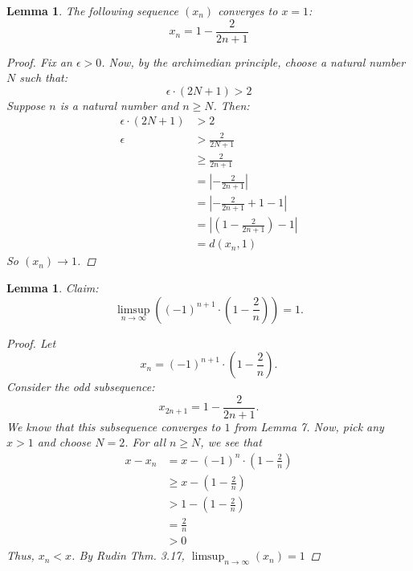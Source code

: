 \documentclass{amsart}
\newtheorem{lemma}[theorem]{Lemma}
\begin{document}
\begin{lemma} 
    The following sequence $(x_n)$ converges to $x = 1$:
    \[
        x_n = 1 - \frac{2}{2n + 1}    
    \]
    \begin{proof}
        Fix an $\epsilon > 0$. Now, by the archimedian principle, choose a natural number $N$ such that:
        \[
            \epsilon \cdot (2N + 1) > 2
        \]
        Suppose $n$ is a natural number and $n \geq N$. Then:
        \begin{align*}
            \epsilon \cdot (2N + 1) &> 2 \\
            \epsilon &> \frac{2}{2N + 1} \\
            &\geq \frac{2}{2n + 1} \\
            &= \left| -\frac{2}{2n + 1} \right| \\
            &= \left| -\frac{2}{2n + 1} + 1 - 1\right| \\
            &= \left|\left(1  -\frac{2}{2n + 1}\right) - 1\right| \\
            &= d(x_n, 1)
        \end{align*}
        So $(x_n) \to 1$.
    \end{proof}
\end{lemma}
\begin{lemma}
    Claim:
    \[
        \limsup_{n \to \infty} \left((-1)^{n+1} \cdot \left( 1 - \frac{2}{n} \right) \right) = 1.
    \]
    \begin{proof}
       Let 
       \[
            x_n = (-1)^{n+1} \cdot \left( 1 - \frac{2}{n} \right).
       \]
       Consider the odd subsequence: 
       \[
            x_{2n + 1} = 1 - \frac{2}{2n + 1} .
       \]
       We know that this subsequence converges to $1$ from Lemma 7.
       Now, pick any $x > 1$ and choose $N = 2$. For all $n \geq N$, we see that
       \begin{align*}
            x - x_n &= x - (-1)^n \cdot \left( 1 - \frac{2}{n} \right) \\
            &\geq x - \left( 1 - \frac{2}{n} \right) \\
            &> 1 - \left( 1 - \frac{2}{n} \right) \\
            &= \frac{2}{n} \\
            &> 0
       \end{align*}
       Thus, $x_n < x$. By Rudin Thm. 3.17,  $\limsup_{n \to \infty} \left(x_n\right) = 1$
    \end{proof}
\end{lemma}
\newpage
\end{document}
